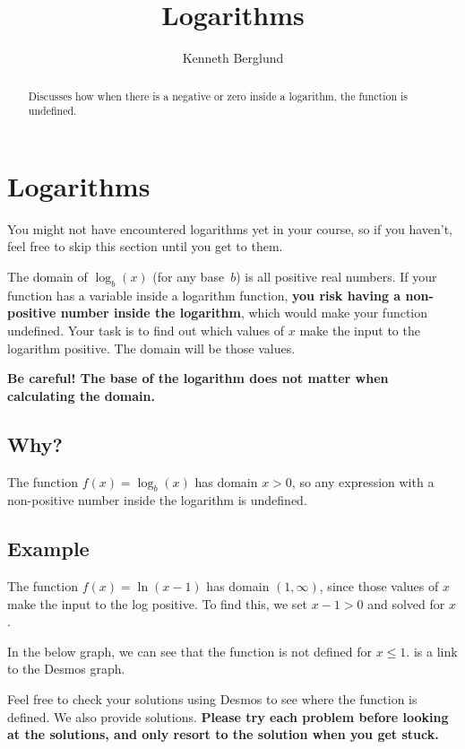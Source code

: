 \documentclass{ximera}
\title{ Logarithms}
\author{Kenneth Berglund}
\begin{document}
\begin{abstract}
Discusses how when there is a negative or zero inside a logarithm, the function is undefined. 
\end{abstract}
\maketitle

\section{Logarithms}
You might not have encountered logarithms yet in your course, so if you haven’t, feel free to skip this section until you get to them.

The domain of $\log_b(x)$ (for any base $b$) is all positive real numbers. If your function has a variable inside a logarithm function, \textbf{you risk having a non-positive number inside the logarithm}, which would make your function undefined. Your task is to find out which values of $x$ make the input to the logarithm positive. The domain will be those values.

\textbf{Be careful! The base of the logarithm does not matter when calculating the domain.}

\subsection{Why?}
The function $f(x) = \log_b(x)$ has domain $x > 0$, so any expression with a non-positive number inside the logarithm is undefined. 

\subsection{Example}
The function $f(x) = \ln(x - 1)$ has domain $(1, \infty)$, since those values of $x$ make the input to the log positive. To find this, we set $x - 1 > 0$ and solved for $x$.

In the below graph, we can see that the function is not defined for $x \le 1$.  is a link to the Desmos graph. 
\begin{center}
\end{center}

Feel free to check your solutions using Desmos to see where the function is defined. We also provide solutions. \textbf{Please try each problem before looking at the solutions, and only resort to the solution when you get stuck.} 
\end{document}
